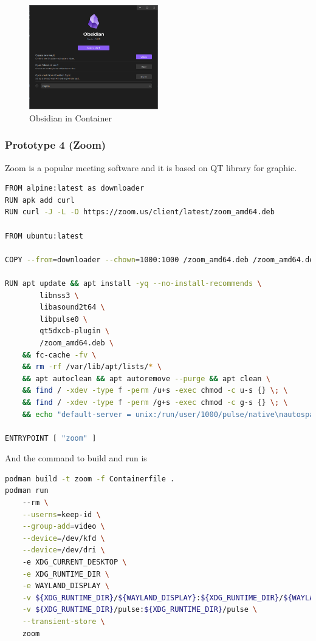 \documentclass[journal,onecolumn]{IEEEtran}
\begin{document}
\begin{figure}[ht]
    \centering
    \includegraphics[width=0.5\textwidth]{proto-obsidian}
    \caption{Obsidian in Container}
    \label{fig:proto-obsidian}
\end{figure}

\subsubsection{Prototype 4 (Zoom)}
Zoom is a popular meeting software and it is based on QT library for graphic.

\begin{lstlisting}[language=Bash]
FROM alpine:latest as downloader
RUN apk add curl
RUN curl -J -L -O https://zoom.us/client/latest/zoom_amd64.deb

FROM ubuntu:latest

COPY --from=downloader --chown=1000:1000 /zoom_amd64.deb /zoom_amd64.deb

RUN apt update && apt install -yq --no-install-recommends \
        libnss3 \
        libasound2t64 \
        libpulse0 \
        qt5dxcb-plugin \
        /zoom_amd64.deb \
    && fc-cache -fv \
    && rm -rf /var/lib/apt/lists/* \
    && apt autoclean && apt autoremove --purge && apt clean \
    && find / -xdev -type f -perm /u+s -exec chmod -c u-s {} \; \
    && find / -xdev -type f -perm /g+s -exec chmod -c g-s {} \; \
    && echo "default-server = unix:/run/user/1000/pulse/native\nautospawn = no\ndaemon-binary = /bin/true\nenable-shm = false" > /etc/pulse/client.conf

ENTRYPOINT [ "zoom" ]
\end{lstlisting}
\newpage
And the command to build and run is
\begin{lstlisting}[language=Bash]
podman build -t zoom -f Containerfile .
podman run
    --rm \
    --userns=keep-id \
    --group-add=video \
    --device=/dev/kfd \
    --device=/dev/dri \ 
    -e XDG_CURRENT_DESKTOP \
    -e XDG_RUNTIME_DIR \
    -e WAYLAND_DISPLAY \
    -v ${XDG_RUNTIME_DIR}/${WAYLAND_DISPLAY}:${XDG_RUNTIME_DIR}/${WAYLAND_DISPLAY} \
    -v ${XDG_RUNTIME_DIR}/pulse:${XDG_RUNTIME_DIR}/pulse \
    --transient-store \
    zoom
\end{lstlisting}
\end{document}
